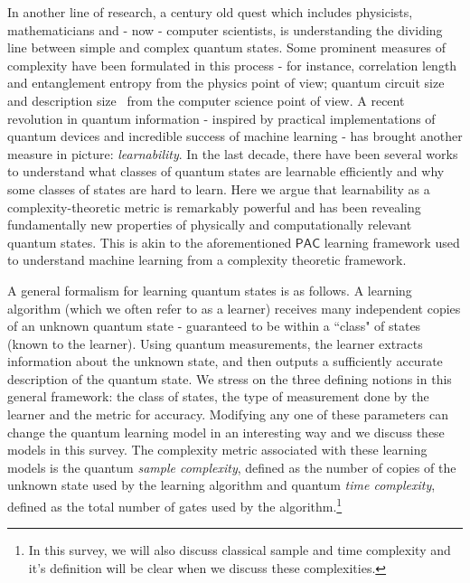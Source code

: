 \documentclass[11pt]{article}
\newcommand{\PAC}{\ensuremath{\mathsf{PAC}}}
\begin{document}
In another line of research, a century old quest which includes physicists, mathematicians and - now - computer scientists, is understanding the dividing line between simple and complex quantum states. Some prominent measures of complexity have been formulated in this process - for instance, correlation length and entanglement entropy \cite{EisertP10} from the physics point of view; quantum circuit size and description size~\cite{aaronson2016complexity} from the computer science point of view. A recent revolution in quantum information - inspired by practical implementations of quantum devices and incredible success of machine learning - has brought another measure in picture: \emph{learnability}. In the last decade, there have been several works to understand what classes of quantum states are learnable efficiently and why some classes of states are hard to learn. Here we argue that learnability as a complexity-theoretic metric is remarkably powerful and has been revealing fundamentally new properties of physically and computationally relevant quantum states. This is akin to the aforementioned $\PAC$ learning framework  used to understand machine learning from a  complexity theoretic framework. 




A general formalism for learning quantum states is as follows. A learning algorithm (which we often refer to as a learner) receives many independent copies of an unknown quantum state - guaranteed to be within a ``class" of states (known to the learner). Using quantum measurements, the learner extracts information about the unknown state, and then outputs a sufficiently accurate description of the quantum state. We stress on the three defining notions in this general framework: the class of states, the type of measurement done by the learner and the metric for accuracy.
Modifying any one of these parameters can change the quantum learning model in an interesting way and we discuss these models in this survey. The complexity metric associated with these learning models is the quantum \emph{sample complexity}, defined as the number of copies of the unknown state used by the learning algorithm and quantum \emph{time complexity}, defined as the total number of gates used by the algorithm.\footnote{In this survey, we will also discuss classical sample and time complexity and it's definition will be clear when we discuss these complexities.}
\end{document}
